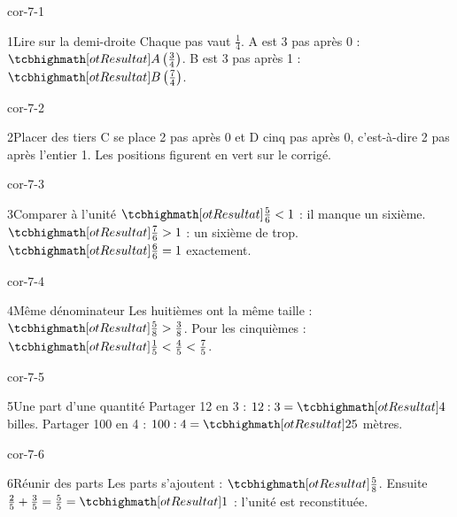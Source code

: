 \clearpage\pagestyle{otMain}\setlength{\otBlocEspacement}{2.5mm}\fontsize{11}{15}\selectfont{}
\begin{blocLivre}{cor-7-1}\begin{corrige}{1}{Lire sur la demi-droite}
Chaque pas vaut $\frac14$. A est 3 pas après 0 : $\res{A\left(\frac34\right)}$. B est 3 pas après 1 : $\res{B\left(\frac74\right)}$.
\label{fig-cor-7-1}
\end{corrige}\end{blocLivre}
\begin{blocLivre}{cor-7-2}\begin{corrige}{2}{Placer des tiers}
C se place 2 pas après 0 et D cinq pas après 0, c’est-à-dire 2 pas après l’entier 1. Les positions figurent en vert sur le corrigé.
\label{fig-cor-7-2}
\end{corrige}\end{blocLivre}
\begin{blocLivre}{cor-7-3}\begin{corrige}{3}{Comparer à l’unité}
$\res{\frac56<1}$ : il manque un sixième. $\res{\frac76>1}$ : un sixième de trop. $\res{\frac66=1}$ exactement.
\end{corrige}\end{blocLivre}
\begin{blocLivre}{cor-7-4}\begin{corrige}{4}{Même dénominateur}
Les huitièmes ont la même taille : $\res{\frac58>\frac38}$. Pour les cinquièmes : $\res{\frac15<\frac45<\frac75}$.
\end{corrige}\end{blocLivre}
\begin{blocLivre}{cor-7-5}\begin{corrige}{5}{Une part d’une quantité}
Partager 12 en 3 : $12:3=\res4$ billes. Partager 100 en 4 : $100:4=\res{25}$ mètres.
\end{corrige}\end{blocLivre}
\begin{blocLivre}{cor-7-6}\begin{corrige}{6}{Réunir des parts}
Les parts s’ajoutent : $\res{\frac58}$. Ensuite $\frac25+\frac35=\frac55=\res1$ : l’unité est reconstituée.
\end{corrige}\end{blocLivre}
